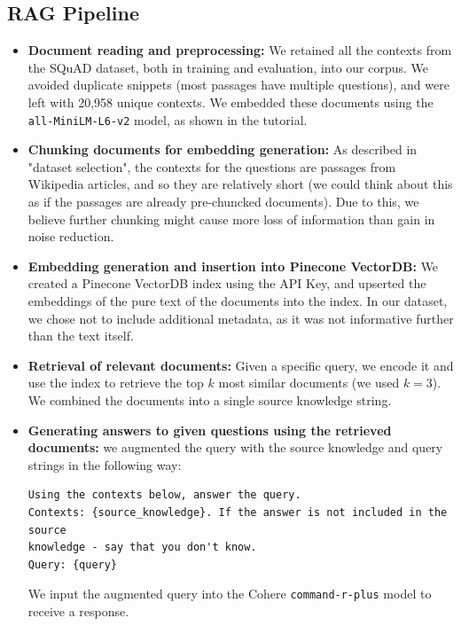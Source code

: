 \documentclass[12pt]{article}
\begin{document}
\subsection{RAG Pipeline}

\begin{itemize}
    \item \textbf{Document reading and preprocessing:} We retained all the contexts from the SQuAD dataset, both in training and evaluation, into our corpus. We avoided duplicate snippets (most passages have multiple questions), and were left with 20,958 unique contexts.
    We embedded these documents using the \texttt{all-MiniLM-L6-v2} model, as shown in the tutorial.
    
    \item \textbf{Chunking documents for embedding generation:} As described in "dataset selection", the contexts for the questions are passages from Wikipedia articles, and so they are relatively short (we could think about this as if the passages are already pre-chuncked documents).
    Due to this, we believe further chunking might cause more loss of information than gain in noise reduction.
    
    \item \textbf{Embedding generation and insertion into Pinecone VectorDB:} We created a Pinecone VectorDB index using the API Key, and upserted the embeddings of the pure text of the documents into the index. 
    In our dataset, we chose not to include additional metadata, as it was not informative further than the text itself.
    
    \item \textbf{Retrieval of relevant documents:} Given a specific query, we encode it and use the index to retrieve the top $k$ most similar documents (we used $k=3$). We combined the documents into a single source knowledge string.

    \item \textbf{Generating answers to given questions using the retrieved documents:} we augmented the query with the source knowledge and query strings in the following way:

\begin{verbatim}
Using the contexts below, answer the query.
Contexts: {source_knowledge}. If the answer is not included in the source 
knowledge - say that you don't know.
Query: {query}
\end{verbatim}

    We input the augmented query into the Cohere \texttt{command-r-plus} model to receive a response.

\end{itemize}
\end{document}

